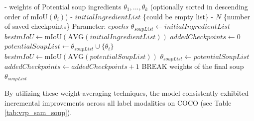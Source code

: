 \documentclass[journal,12pt,onecolumn,draftclsnofoot]{IEEEtran}
\begin{document}
\begin{algorithm}[H]
\caption{Iterative Uniform Greedy Soup \cite{wasfy2023enhancing}}
\label{alg:iterative_greedy_soup}
\begin{algorithmic}[1]
- weights of Potential soup ingredients $\theta_1, ..., \theta_k$ (optionally sorted in descending order of $\text{mIoU}(\theta_i)$)
- $initialIngredientList$ \{could be empty list\}
- $N$ \{number of saved checkpoints\}
\REQUIRE Parameter: $epochs$
\STATE $\theta_{soupList} \leftarrow initialIngredientList$
\STATE $bestmIoU \leftarrow \text{mIoU}(\text{AVG}(initialIngredientList))$
    \STATE $addedCheckpoints \leftarrow 0$
        \STATE $potentialSoupList \leftarrow \theta_{soupList} \cup \{\theta_i\}$
            \STATE $bestmIoU \leftarrow \text{mIoU}(\text{AVG}(potentialSoupList))$
            \STATE $\theta_{soupList} \leftarrow potentialSoupList$
            \STATE $addedCheckpoints \leftarrow addedCheckpoints + 1$
        \ENDIF
    \ENDFOR
        \STATE BREAK 
    \ENDIF
\ENDFOR
\RETURN weights of the final soup $\theta_{soupList}$ 
\end{algorithmic}
\end{algorithm}

By utilizing these weight-averaging techniques, the model consistently exhibited incremental improvements across all label modalities on COCO (see Table \ref{tab:vrp_sam_soup}).

\begin{table}[htbp]
\centering
\caption{VRP-SAM Model Soup Enhancements on COCO Dataset (ResNet-50, mIoU \%)}
\label{tab:vrp_sam_soup}
\end{table}
\end{document}
